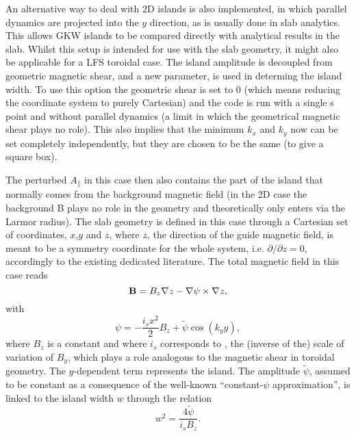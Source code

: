An alternative way to deal with 2D islands is also implemented, in which
parallel dynamics are projected into the $y$ direction, 
as is usually done in slab analytics.  This allows GKW islands to be compared
directly with analytical results in the slab.   Whilst this setup is intended for use with the slab geometry, 
it might also be applicable for a LFS toroidal case.
The island amplitude is decoupled from geometric magnetic shear, and 
a new parameter,  is used in determing the island width.
To use this option the geometric shear  is set to 0 (which
means reducing the coordinate system to purely Cartesian) and the code is
run with a single s point and without parallel dynamics 
(a limit in which the geometrical magnetic shear plays no role).
This also implies that the minimum $k_x$ and $k_y$ now can be set completely
independently, but they are chosen to be the same (to give a square box).

The perturbed $A_\parallel$ in this case then also contains the part of the island that
normally comes from the background magnetic field (in the 2D case the background B
plays no role in the geometry and theoretically only enters via the Larmor
radius). The slab geometry is defined in this case through a Cartesian set of
coordinates, $x$,$y$ and $z$, where $z$, the direction of the guide magnetic
field, is meant to be a symmetry coordinate for the whole system,
i.e. $\partial/\partial z = 0$, accordingly to the existing dedicated literature. 
The total magnetic field in this case reads
\begin{equation}
{\bf B} = B_z \nabla z -\nabla \psi \times \nabla z,
\end{equation}
with 
\begin{equation}
\psi = -\frac{i_s x^2}{2}B_z+\tilde{\psi}\cos( k_y y),
\label{psiisl}
\end{equation}
where $B_z$ is a constant and where  $i_s$ corresponds to ,
the (inverse of the) scale of variation of $B_y$, which plays a role analogous
to the magnetic shear in toroidal geometry. The $y$-dependent term represents
the island.  The amplitude $\tilde{\psi}$, assumed to be constant as a
consequence of the well-known ``constant-$\psi$ approximation'', is  linked to the island width $w$ through the relation
\begin{equation}
w^2=\frac{4 \tilde{\psi}}{i_s B_z}.
\end{equation}


